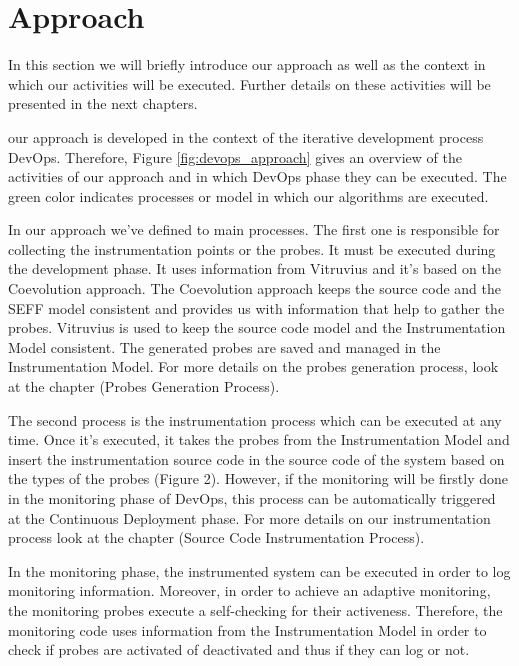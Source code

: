\section{Approach}
\label{sec:approach}
In this section we will briefly introduce our approach as well as the context in which our activities will be executed. Further details on these activities will be presented in the next chapters.

our approach is developed in the context of the iterative development process DevOps. Therefore, Figure \ref{fig:devops_approach} gives an overview of the activities of our approach and in which DevOps phase they can be executed. The green color indicates processes or model in which our algorithms are executed. 

In our approach we've defined to main processes. The first one is responsible for collecting the instrumentation points or the probes. It must be executed during the development phase. It uses information from Vitruvius and it's based on the Coevolution approach. The Coevolution approach keeps the source code and the SEFF model consistent and provides us with information that help to gather the probes. Vitruvius is used to keep the source code model and the Instrumentation Model consistent. The generated probes are saved and managed in the Instrumentation Model. For more details on the probes generation process, look at the chapter (Probes Generation Process).

The second process is the instrumentation process which can be executed at any time. Once it's executed, it takes the probes from the Instrumentation Model and insert the instrumentation source code in the source code of the system based on the types of the probes (Figure 2). However, if the monitoring will be firstly done in the monitoring phase of DevOps, this process can be automatically triggered at the Continuous Deployment phase. For more details on our instrumentation process look at the chapter (Source Code Instrumentation Process).

In the monitoring phase, the instrumented system can be executed in order to log monitoring information. Moreover, in order to achieve an adaptive monitoring, the monitoring probes execute a self-checking for their activeness. Therefore, the monitoring code uses information from the Instrumentation Model in order to check if probes are activated of deactivated and thus if they can log or not. 


